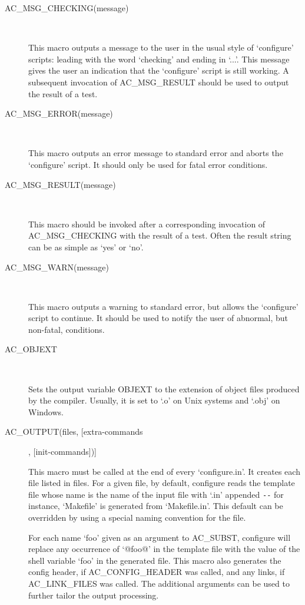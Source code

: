 \begin{description}
\item[AC\_{}MSG\_{}CHECKING(message)]
\

    This macro outputs a message to the user in the usual style of `configure' scripts: leading with the word `checking' and ending in `...'. This message gives the user an indication that the `configure' script is still working. A subsequent invocation of AC\_{}MSG\_{}RESULT should be used to output the result of a test.

\item[AC\_{}MSG\_{}ERROR(message)]
\

    This macro outputs an error message to standard error and aborts the `configure' script. It should only be used for fatal error conditions.

\item[AC\_{}MSG\_{}RESULT(message)]
\

This macro should be invoked after a corresponding invocation of 
AC\_{}MSG\_{}CHECKING with the result of a test. Often the 
result string can be as simple as `yes' or `no'.

\item[AC\_{}MSG\_{}WARN(message)]
\

    This macro outputs a warning to standard error, but allows the `configure' script to continue. It should be used to notify the user of abnormal, but non-fatal, conditions.

\item[AC\_{}OBJEXT]
\

    Sets the output variable OBJEXT to the extension of object files produced by the compiler. Usually, it is set to `.o' on Unix systems and `.obj' on Windows.

\item[AC\_{}OUTPUT(files, [extra-commands], [init-commands])]
\

    This macro must be called at the end of every `configure.in'. It creates each file listed in files. For a given file, by default, configure reads the template file whose name is the name of the input file with `.in' appended \verb+--+ for instance, `Makefile' is generated from `Makefile.in'. This default can be overridden by using a special naming convention for the file.

    For each name `foo' given as an argument to AC\_{}SUBST, configure will replace any occurrence of `@foo@' in the template file with the value of the shell variable `foo' in the generated file. This macro also generates the config header, if AC\_{}CONFIG\_{}HEADER was called, and any links, if AC\_{}LINK\_{}FILES was called. The additional arguments can be used to further tailor the output processing.


\end{description}
